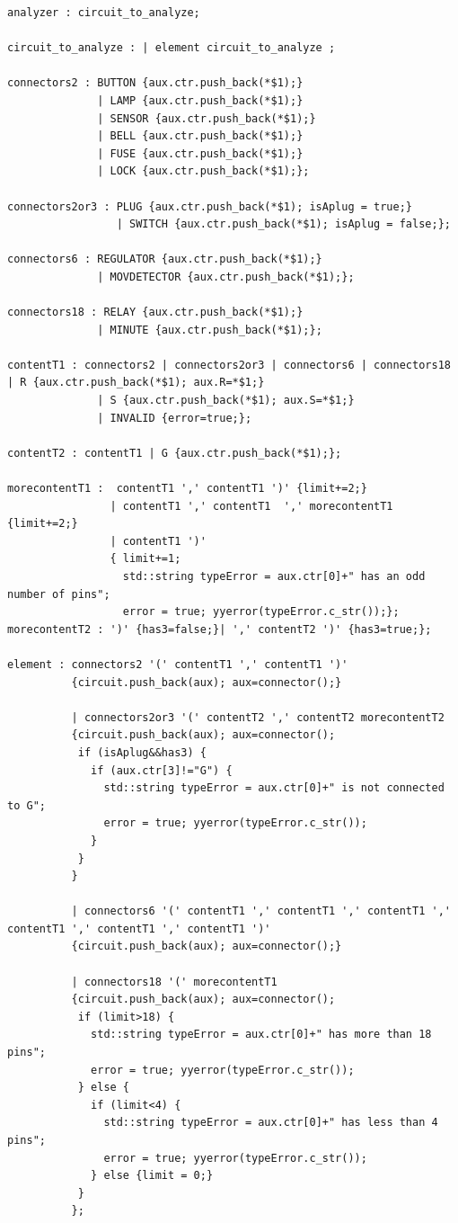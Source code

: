 \documentclass{article}
\begin{document}
\newpage

\begin{verbatim}
analyzer : circuit_to_analyze;

circuit_to_analyze : | element circuit_to_analyze ;

connectors2 : BUTTON {aux.ctr.push_back(*$1);}
              | LAMP {aux.ctr.push_back(*$1);}
              | SENSOR {aux.ctr.push_back(*$1);}
              | BELL {aux.ctr.push_back(*$1);}
              | FUSE {aux.ctr.push_back(*$1);}
              | LOCK {aux.ctr.push_back(*$1);};

connectors2or3 : PLUG {aux.ctr.push_back(*$1); isAplug = true;}
                 | SWITCH {aux.ctr.push_back(*$1); isAplug = false;};

connectors6 : REGULATOR {aux.ctr.push_back(*$1);}
              | MOVDETECTOR {aux.ctr.push_back(*$1);};

connectors18 : RELAY {aux.ctr.push_back(*$1);}
              | MINUTE {aux.ctr.push_back(*$1);};

contentT1 : connectors2 | connectors2or3 | connectors6 | connectors18  | R {aux.ctr.push_back(*$1); aux.R=*$1;}
              | S {aux.ctr.push_back(*$1); aux.S=*$1;}
              | INVALID {error=true;};

contentT2 : contentT1 | G {aux.ctr.push_back(*$1);};

morecontentT1 :  contentT1 ',' contentT1 ')' {limit+=2;}
                | contentT1 ',' contentT1  ',' morecontentT1 {limit+=2;}
                | contentT1 ')'
                { limit+=1;
                  std::string typeError = aux.ctr[0]+" has an odd number of pins";
                  error = true; yyerror(typeError.c_str());};
morecontentT2 : ')' {has3=false;}| ',' contentT2 ')' {has3=true;};

element : connectors2 '(' contentT1 ',' contentT1 ')'
          {circuit.push_back(aux); aux=connector();}

          | connectors2or3 '(' contentT2 ',' contentT2 morecontentT2
          {circuit.push_back(aux); aux=connector();
           if (isAplug&&has3) {
             if (aux.ctr[3]!="G") {
               std::string typeError = aux.ctr[0]+" is not connected to G";
               error = true; yyerror(typeError.c_str());
             }
           }
          }

          | connectors6 '(' contentT1 ',' contentT1 ',' contentT1 ',' contentT1 ',' contentT1 ',' contentT1 ')'
          {circuit.push_back(aux); aux=connector();}

          | connectors18 '(' morecontentT1
          {circuit.push_back(aux); aux=connector();
           if (limit>18) {
             std::string typeError = aux.ctr[0]+" has more than 18 pins";
             error = true; yyerror(typeError.c_str());
           } else {
             if (limit<4) {
               std::string typeError = aux.ctr[0]+" has less than 4 pins";
               error = true; yyerror(typeError.c_str());
             } else {limit = 0;}
           }
          };
\end{verbatim}

\newpage
\end{document}
